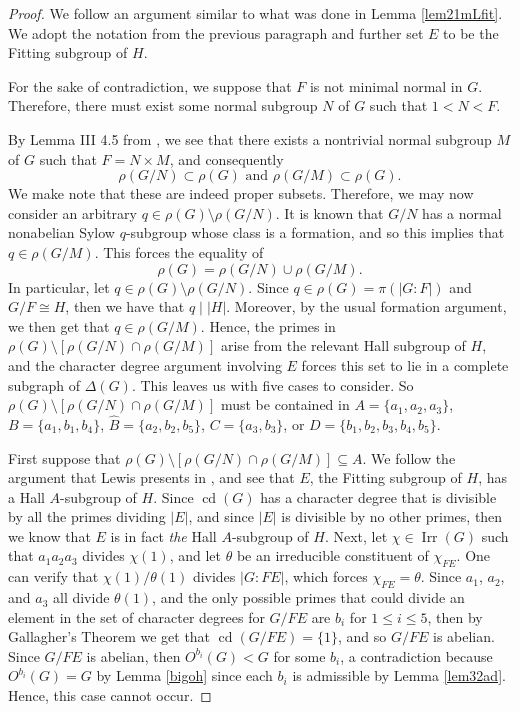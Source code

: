 \documentclass[11pt]{amsart}
\theoremstyle{definition}
\theoremstyle{remark}
\DeclareMathOperator{\cd}{cd}
\DeclareMathOperator{\Irr}{Irr}
\numberwithin{equation}{section}
\begin{document}
\begin{proof}
We follow an argument similar to what was done in Lemma \ref{lem21mLfit}. We adopt the notation from the previous paragraph and further set $E$ to be the Fitting subgroup of $H$.

For the sake of contradiction, we suppose that $F$ is not minimal normal in $G$. Therefore, there must exist some normal subgroup $N$ of $G$ such that $1<N<F$.

By Lemma III 4.5 from \cite{H}, we see that there exists a nontrivial normal subgroup $M$ of $G$ such that $F=N\times M$, and consequently
\begin{equation}\label{eqsub}
\rho(G/N)\subset\rho(G)\text{~and~}\rho(G/M)\subset\rho(G).  
\end{equation}
We make note that these are indeed proper subsets. Therefore, we may now consider an arbitrary $q\in\rho(G)\setminus\rho(G/N)$. It is known that $G/N$ has a normal nonabelian Sylow $q$-subgroup whose class is a formation, and so this implies that $q\in\rho(G/M)$. This forces the equality of
\begin{equation}\label{equn}
\rho(G)=\rho(G/N)\cup\rho(G/M).
\end{equation}
In particular, let $q\in\rho(G)\setminus\rho(G/N)$. Since $q\in\rho(G)=\pi(|G:F|)$ and $G/F\cong H$, then we have that $q\mid|H|$. Moreover, by the usual formation argument, we then get that $q\in\rho(G/M)$. Hence, the primes in $\rho(G)\setminus[\rho(G/N)\cap\rho(G/M)]$ arise from the relevant Hall subgroup of $H$, and the character degree argument involving $E$ forces this set to lie in a complete subgraph of $\Delta(G)$. This leaves us with five cases to consider. So $\rho(G)\setminus[\rho(G/N)\cap\rho(G/M)]$ must be contained in $A=\{a_1,a_2,a_3\}$, $B=\{a_1,b_1,b_4\}$, $\widehat{B}=\{a_2,b_2,b_5\}$, $C=\{a_3,b_3\}$, or $D=\{b_1,b_2,b_3,b_4,b_5\}$.

First suppose that $\rho(G)\setminus[\rho(G/N)\cap\rho(G/M)]\subseteq A$. We follow the argument that Lewis presents in \cite{L3}, and see that $E$, the Fitting subgroup of $H$, has a Hall $A$-subgroup of $H$. Since $\cd(G)$ has a character degree that is divisible by all the primes dividing $|E|$, and since $|E|$ is divisible by no other primes, then we know that $E$ is in fact \emph{the} Hall $A$-subgroup of $H$. Next, let $\chi\in\Irr(G)$ such that $a_1a_2a_3$ divides $\chi(1)$, and let $\theta$ be an irreducible constituent of $\chi_{FE}$. One can verify that $\chi(1)/\theta(1)$ divides $|G:FE|$, which forces $\chi_{FE}=\theta$. Since $a_1$, $a_2$, and $a_3$ all divide $\theta(1)$, and the only possible primes that could divide an element in the set of character degrees for $G/FE$ are $b_i$ for $1\leq i\leq5$, then by Gallagher's Theorem we get that $\cd(G/FE)=\{1\}$, and so $G/FE$ is abelian. Since $G/FE$ is abelian, then $O^{b_i}(G)<G$ for some $b_i$, a contradiction because $O^{b_i}(G)=G$ by Lemma \ref{bigoh} since each $b_i$ is admissible by Lemma \ref{lem32ad}. Hence, this case cannot occur.


\end{proof}
\end{document}
